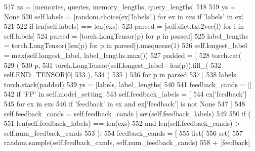 \begin{DoxyCode}
517         xs = [memories, queries, memory\_lengths, query\_lengths]
518 
519         ys = \textcolor{keywordtype}{None}
520         self.labels = [random.choice(ex[\textcolor{stringliteral}{'labels'}]) \textcolor{keywordflow}{for} ex \textcolor{keywordflow}{in} exs \textcolor{keywordflow}{if} \textcolor{stringliteral}{'labels'} \textcolor{keywordflow}{in} ex]
521 
522         \textcolor{keywordflow}{if} len(self.labels) == len(exs):
523             parsed = [self.dict.txt2vec(l) \textcolor{keywordflow}{for} l \textcolor{keywordflow}{in} self.labels]
524             parsed = [torch.LongTensor(p) \textcolor{keywordflow}{for} p \textcolor{keywordflow}{in} parsed]
525             label\_lengths = torch.LongTensor([len(p) \textcolor{keywordflow}{for} p \textcolor{keywordflow}{in} parsed]).unsqueeze(1)
526             self.longest\_label = max(self.longest\_label, label\_lengths.max())
527             padded = [
528                 torch.cat(
529                     (
530                         p,
531                         torch.LongTensor(self.longest\_label - len(p)).fill\_(
532                             self.END\_TENSOR[0]
533                         ),
534                     )
535                 )
536                 \textcolor{keywordflow}{for} p \textcolor{keywordflow}{in} parsed
537             ]
538             labels = torch.stack(padded)
539             ys = [labels, label\_lengths]
540 
541         feedback\_cands = []
542         \textcolor{keywordflow}{if} \textcolor{stringliteral}{'FP'} \textcolor{keywordflow}{in} self.model\_setting:
543             self.feedback\_labels = [
544                 ex[\textcolor{stringliteral}{'feedback'}]
545                 \textcolor{keywordflow}{for} ex \textcolor{keywordflow}{in} exs
546                 \textcolor{keywordflow}{if} \textcolor{stringliteral}{'feedback'} \textcolor{keywordflow}{in} ex \textcolor{keywordflow}{and} ex[\textcolor{stringliteral}{'feedback'}] \textcolor{keywordflow}{is} \textcolor{keywordflow}{not} \textcolor{keywordtype}{None}
547             ]
548             self.feedback\_cands = self.feedback\_cands | set(self.feedback\_labels)
549 
550             \textcolor{keywordflow}{if} (
551                 len(self.feedback\_labels) == len(exs)
552                 \textcolor{keywordflow}{and} len(self.feedback\_cands) > self.num\_feedback\_cands
553             ):
554                 feedback\_cands = [
555                     list(
556                         set(
557                             random.sample(self.feedback\_cands, self.num\_feedback\_cands)
558                             + [feedback]

\end{DoxyCode}
